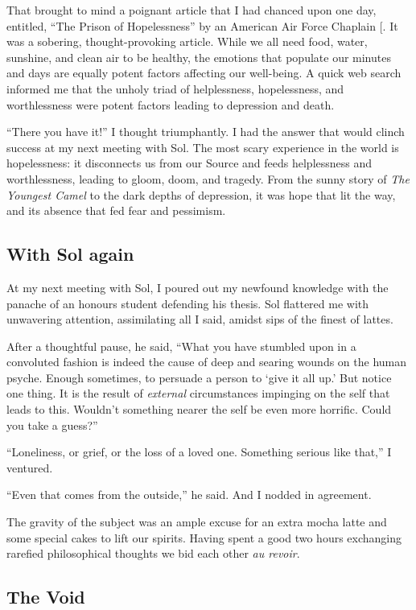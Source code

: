 \documentclass[
  a4paper,
]{article}
\begin{document}
That brought to mind a poignant article that I had chanced upon one day,
entitled, ``The Prison of Hopelessness'' by an American Air Force
Chaplain {[}\citeproc{ref-wilson2006}{2}{]}. It was a sobering,
thought-provoking article. While we all need food, water, sunshine, and
clean air to be healthy, the emotions that populate our minutes and days
are equally potent factors affecting our well-being. A quick web search
informed me that the unholy triad of helplessness, hopelessness, and
worthlessness were potent factors leading to depression and death.

``There you have it!'' I thought triumphantly. I had the answer that
would clinch success at my next meeting with Sol. The most scary
experience in the world is hopelessness: it disconnects us from our
Source and feeds helplessness and worthlessness, leading to gloom, doom,
and tragedy. From the sunny story of \emph{The Youngest Camel} to the
dark depths of depression, it was hope that lit the way, and its absence
that fed fear and pessimism.

\subsection{With Sol again}\label{with-sol-again}

At my next meeting with Sol, I poured out my newfound knowledge with the
panache of an honours student defending his thesis. Sol flattered me
with unwavering attention, assimilating all I said, amidst sips of the
finest of lattes.

After a thoughtful pause, he said, ``What you have stumbled upon in a
convoluted fashion is indeed the cause of deep and searing wounds on the
human psyche. Enough sometimes, to persuade a person to `give it all
up.' But notice one thing. It is the result of \emph{external}
circumstances impinging on the self that leads to this. Wouldn't
something nearer the self be even more horrific. Could you take a
guess?''

``Loneliness, or grief, or the loss of a loved one. Something serious
like that,'' I ventured.

``Even that comes from the outside,'' he said. And I nodded in
agreement.

The gravity of the subject was an ample excuse for an extra mocha latte
and some special cakes to lift our spirits. Having spent a good two
hours exchanging rarefied philosophical thoughts we bid each other
\emph{au revoir}.

\subsection{The Void}\label{the-void}
\end{document}
